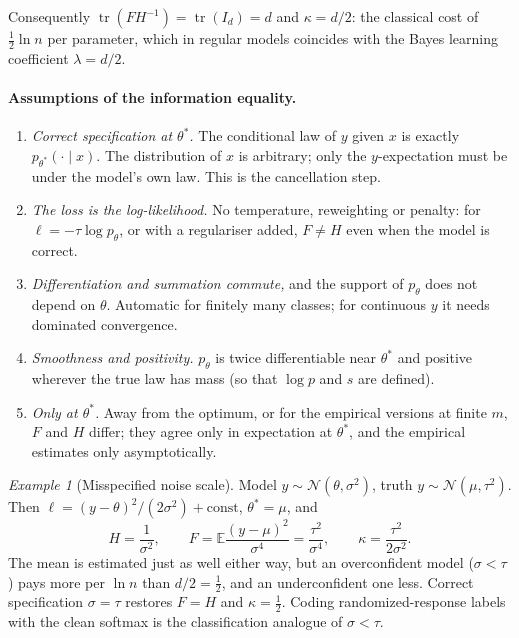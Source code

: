 \documentclass[11pt]{article}
\theoremstyle{remark}
\newtheorem*{example}{Example}
\newcommand{\E}{\mathbb{E}}
\newcommand{\tr}{\operatorname{tr}}
\newcommand{\ts}{\theta^*}
\begin{document}
\noindent Consequently $\tr(FH^{-1})=\tr(I_d)=d$ and $\kappa=d/2$: the classical cost of $\tfrac12\ln n$ per parameter, which in regular models coincides with the Bayes learning coefficient $\lambda=d/2$.

\paragraph{Assumptions of the information equality.}
\begin{enumerate}
\item \emph{Correct specification at $\ts$.} The conditional law of $y$ given $x$ is exactly $p_{\ts}(\cdot\mid x)$. The distribution of $x$ is arbitrary; only the $y$-expectation must be under the model's own law. This is the cancellation step.
\item \emph{The loss is the log-likelihood.} No temperature, reweighting or penalty: for $\ell=-\tau\log p_\theta$, or with a regulariser added, $F\neq H$ even when the model is correct.
\item \emph{Differentiation and summation commute,} and the support of $p_\theta$ does not depend on $\theta$. Automatic for finitely many classes; for continuous $y$ it needs dominated convergence.
\item \emph{Smoothness and positivity.} $p_\theta$ is twice differentiable near $\ts$ and positive wherever the true law has mass (so that $\log p$ and $s$ are defined).
\item \emph{Only at $\ts$.} Away from the optimum, or for the empirical versions at finite $m$, $F$ and $H$ differ; they agree only in expectation at $\ts$, and the empirical estimates only asymptotically.
\end{enumerate}

\begin{example}[Misspecified noise scale]
Model $y\sim\mathcal N(\theta,\sigma^2)$, truth $y\sim\mathcal N(\mu,\tau^2)$. Then $\ell=(y-\theta)^2/(2\sigma^2)+\text{const}$, $\ts=\mu$, and
\[
H=\frac1{\sigma^2},\qquad F=\E\frac{(y-\mu)^2}{\sigma^4}=\frac{\tau^2}{\sigma^4},\qquad \kappa=\frac{\tau^2}{2\sigma^2}.
\]
The mean is estimated just as well either way, but an overconfident model ($\sigma<\tau$) pays more per $\ln n$ than $d/2=\tfrac12$, and an underconfident one less. Correct specification $\sigma=\tau$ restores $F=H$ and $\kappa=\tfrac12$. Coding randomized-response labels with the clean softmax is the classification analogue of $\sigma<\tau$.
\end{example}
\end{document}
